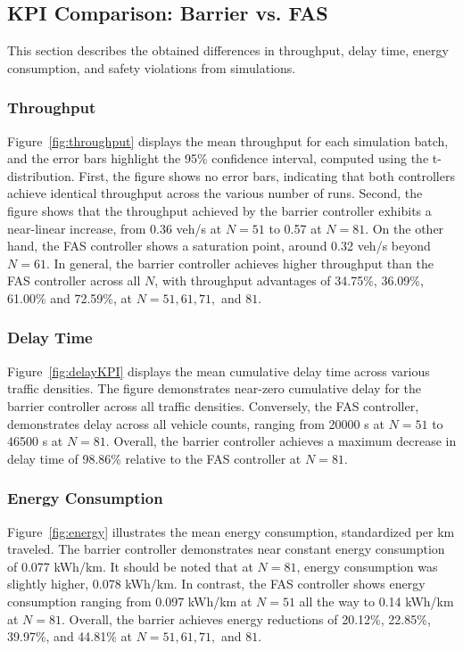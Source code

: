 \subsection{KPI Comparison: Barrier vs. FAS}
This section describes the obtained differences in throughput, delay time, energy consumption, and safety violations from simulations.
 \subsubsection{Throughput}
 Figure~\ref{fig:throughput} displays the mean throughput for each simulation batch, and the error bars highlight the 95\% confidence interval, computed using the t-distribution. First, the figure shows no error bars, indicating that both controllers achieve identical throughput across the various number of runs. Second, the figure shows that the throughput achieved by the barrier controller exhibits a near-linear increase, from 0.36 veh/s at \(N=51\) to 0.57 at \(N=81\). On the other hand, the FAS controller shows a saturation point, around 0.32 veh/s beyond \(N=61\). In general, the barrier controller achieves higher throughput than the FAS controller across all \(N\), with throughput advantages of 34.75\%, 36.09\%, 61.00\% and 72.59\%, at \(N=51, 61, 71,\) and \(81\).   

\subsubsection{Delay Time}
Figure~\ref{fig:delayKPI} displays the mean cumulative delay time across various traffic densities. The figure demonstrates near-zero cumulative delay for the barrier controller across all traffic densities. Conversely, the FAS controller, demonstrates delay across all vehicle counts, ranging from 20000 s at \(N=51\) to 46500 s at \(N=81\). Overall, the barrier controller achieves a maximum decrease in delay time of 98.86\% relative to the FAS controller at \(N=81\).   



\subsubsection{Energy Consumption}
Figure~\ref{fig:energy} illustrates the mean energy consumption, standardized per km traveled. The barrier controller demonstrates near constant energy consumption of 0.077 kWh/km. It should be noted that at \(N=81\), energy consumption was slightly higher, 0.078 kWh/km.
In contrast, the FAS controller shows energy consumption ranging from 0.097 kWh/km at \(N=51\) all the way to 0.14 kWh/km at \(N=81\). Overall,  the barrier achieves energy reductions of 20.12\%, 22.85\%, 39.97\%, and 44.81\% at \(N=51, 61, 71,\) and \(81\).  


